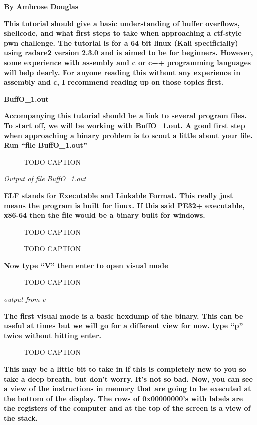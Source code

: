 \documentclass[letterpaper]{article}
\newcommand{\sitfig}[3]{
\begin{figure}[H]
\centering
\makebox[\textwidth][c]{
#2
}
\caption{#3}
\label{#1}
\end{figure}
}
\newcommand{\sitgfx}[4][scale=1.0]{
\sitfig{#3}{\texttt{[image: \#2]}}{#4}
}
\begin{document}
{\centering
\textbf{By Ambrose Douglas}
\par}

\textbf{This tutorial should give a basic understanding of buffer overflows, shellcode, and what first steps to take
when approaching a ctf-style pwn challenge. The tutorial is for a 64 bit linux (Kali specificially) using radare2
version 2.3.0 and is aimed to be for beginners. However, some experience with assembly and c or c++ programming
languages will help dearly. For anyone reading this without any experience in assembly and c, I recommend reading up on
those topics first.}

\textbf{BuffO\_1.out}

\textbf{Accompanying this tutorial should be a link to several program files. To start off, we will be working with
BuffO\_1.out. A good first step when approaching a binary problem is to scout a little about your file. Run ``file
BuffO\_1.out''}

  
\sitgfx[width=5.8335in,height=0.7665in]{FINALWORKINGDOCFORMERLYPRECURSOR-img073.png}{fig:unk}{TODO CAPTION}
 

\textit{Output of file BuffO\_1.out}

\textbf{ELF stands for Executable and Linkable Format. This really just means the program is built for linux. If this
said PE32+ executable, x86-64 then the file would be a binary built for windows.}

  
\sitgfx[width=5.8335in,height=0.9602in]{FINALWORKINGDOCFORMERLYPRECURSOR-img074.png}{fig:unk}{TODO CAPTION}
 

  
\sitgfx[width=5.8335in,height=3.6457in]{FINALWORKINGDOCFORMERLYPRECURSOR-img075.png}{fig:unk}{TODO CAPTION}
 

\textbf{Now type ``V'' then enter to open visual mode}

  
\sitgfx[width=5.8335in,height=3.6457in]{FINALWORKINGDOCFORMERLYPRECURSOR-img076.png}{fig:unk}{TODO CAPTION}
 

\textit{output from v}

\textbf{The first visual mode is a basic hexdump of the binary. This can be useful at times but we will go for a
different view for now. type ``p'' twice without hitting enter.}

  
\sitgfx[width=5.8335in,height=3.6457in]{FINALWORKINGDOCFORMERLYPRECURSOR-img077.png}{fig:unk}{TODO CAPTION}
 

\textbf{This may be a little bit to take in if this is completely new to you so take a deep breath, but don't worry.
It's not so bad. Now, you can see a view of the instructions in memory that are going to be executed at the bottom of
the display. The rows of 0x00000000's with labels are the registers of the computer and at the top of the screen is a
view of the stack.}
\end{document}
